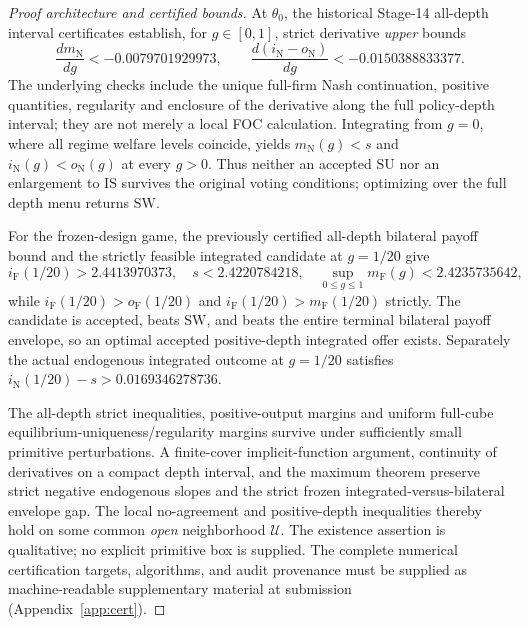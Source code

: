 \documentclass[11pt,a4paper]{article}
\theoremstyle{remark}\newtheorem{remark}[theorem]{Remark}
\newcommand{\SW}{\mathrm{SW}}\newcommand{\SU}{\mathrm{SU}}\newcommand{\IS}{\mathrm{IS}}
\newcommand{\N}{\mathrm{N}}\newcommand{\F}{\mathrm{F}}
\begin{document}
\begin{proof}[Proof architecture and certified bounds]
At $\theta_0$, the historical Stage-14 all-depth interval certificates establish, for $g\in[0,1]$, strict derivative \emph{upper} bounds
\begin{equation}\label{eq:cert}
\frac{dm_{\N}}{dg}<-0.0079701929973,\qquad
\frac{d(i_{\N}-o_{\N})}{dg}<-0.0150388833377.
\end{equation}
The underlying checks include the unique full-firm Nash continuation, positive quantities, regularity and enclosure of the derivative along the full policy-depth interval; they are not merely a local FOC calculation. Integrating from $g=0$, where all regime welfare levels coincide, yields $m_{\N}(g)<s$ and $i_{\N}(g)<o_{\N}(g)$ at every $g>0$. Thus neither an accepted $\SU$ nor an enlargement to $\IS$ survives the original voting conditions; optimizing over the full depth menu returns $\SW$.

For the frozen-design game, the previously certified all-depth bilateral payoff bound and the strictly feasible integrated candidate at $g=1/20$ give
\begin{equation}\label{eq:frozenCert}
 i_{\F}(1/20)>2.4413970373,
\quad s<2.4220784218,
\quad\sup_{0\le g\le1}m_{\F}(g)<2.4235735642,
\end{equation}
while $i_{\F}(1/20)>o_{\F}(1/20)$ and $i_{\F}(1/20)>m_{\F}(1/20)$ strictly. The candidate is accepted, beats $\SW$, and beats the entire terminal bilateral payoff envelope, so an optimal accepted positive-depth integrated offer exists. Separately the actual endogenous integrated outcome at $g=1/20$ satisfies $i_{\N}(1/20)-s>0.0169346278736$.

The all-depth strict inequalities, positive-output margins and uniform full-cube equilibrium-uniqueness/regularity margins survive under sufficiently small primitive perturbations. A finite-cover implicit-function argument, continuity of derivatives on a compact depth interval, and the maximum theorem preserve strict negative endogenous slopes and the strict frozen integrated-versus-bilateral envelope gap. The local no-agreement and positive-depth inequalities thereby hold on some common \emph{open} neighborhood $\mathcal U$. The existence assertion is qualitative; no explicit primitive box is supplied. The complete numerical certification targets, algorithms, and audit provenance must be supplied as machine-readable supplementary material at submission (Appendix~\ref{app:cert}).
\end{proof}
\end{document}

